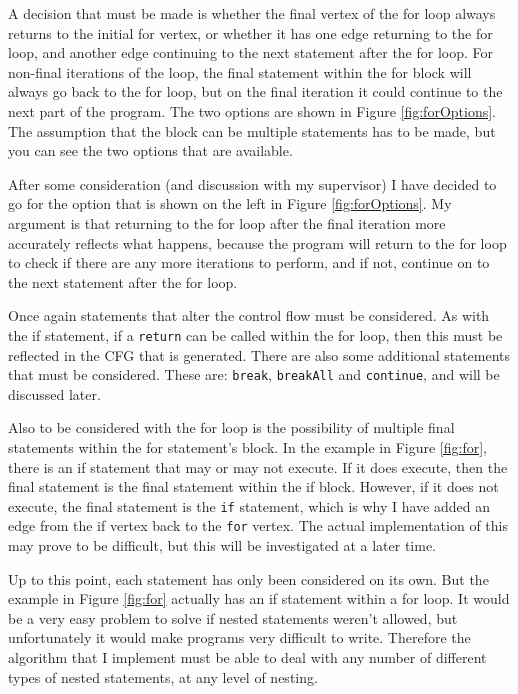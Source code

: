 A decision that must be made is whether the final vertex of the for loop always returns to the initial for vertex, or whether it has one edge returning to the for loop, and another edge continuing to the next statement after the for loop. For non-final iterations of the loop, the final statement within the for block will always go back to the for loop, but on the final iteration it could continue to the next part of the program. The two options are shown in Figure \ref{fig:forOptions}. The assumption that the block can be multiple statements has to be made, but you can see the two options that are available.

After some consideration (and discussion with my supervisor) I have decided to go for the option that is shown on the left in Figure \ref{fig:forOptions}. My argument is that returning to the for loop after the final iteration more accurately reflects what happens, because the program will return to the for loop to check if there are any more iterations to perform, and if not, continue on to the next statement after the for loop.

Once again statements that alter the control flow must be considered. As with the if statement, if a \verb|return| can be called within the for loop, then this must be reflected in the CFG that is generated. There are also some additional statements that must be considered. These are: \verb|break|, \verb|breakAll| and \verb|continue|, and will be discussed later.

Also to be considered with the for loop is the possibility of multiple final statements within the for statement's block. In the example in Figure \ref{fig:for}, there is an if statement that may or may not execute. If it does execute, then the final statement is the final statement within the if block. However, if it does not execute, the final statement is the \verb|if| statement, which is why I have added an edge from the if vertex back to the \verb|for| vertex. The actual implementation of this may prove to be difficult, but this will be investigated at a later time.

Up to this point, each statement has only been considered on its own. But the example in Figure \ref{fig:for} actually has an if statement within a for loop. It would be a very easy problem to solve if nested statements weren't allowed, but unfortunately it would make programs very difficult to write. Therefore the algorithm that I implement must be able to deal with any number of different types of nested statements, at any level of nesting.

